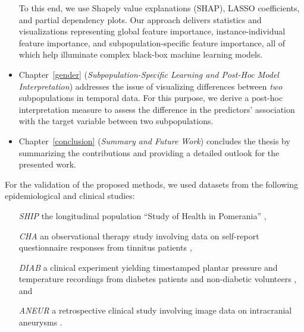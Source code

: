 \documentclass[
  oneside]{book}
\begin{document}
\begin{itemize}
  To this end, we use Shapely value explanations (SHAP), LASSO coefficients, and partial dependency plots.
  Our approach delivers statistics and visualizations representing global feature importance, instance-individual feature importance, and subpopulation-specific feature importance, all of which help illuminate complex black-box machine learning models.
\item
  Chapter~\ref{gender} (\emph{Subpopulation-Specific Learning and Post-Hoc Model Interpretation}) addresses the issue of visualizing differences between \emph{two} subpopulations in temporal data. For this purpose, we derive a post-hoc interpretation measure to assess the difference in the predictors' association with the target variable between two subpopulations.
\item
  Chapter~\ref{conclusion} (\emph{Summary and Future Work}) concludes the thesis by summarizing the contributions and providing a detailed outlook for the presented work.
\end{itemize}

For the validation of the proposed methods, we used datasets from the following epidemiological and clinical studies:

\begin{enumerate}
  \item[\emph{SHIP}] the longitudinal population ``Study of Health in Pomerania'' \autocite{Voelzke:SHIP11},
  \item[\emph{CHA}] an observational therapy study involving data on self-report questionnaire responses from tinnitus patients \autocite{Niemann:PONE2020}, 
  \item[\emph{DIAB}] a clinical experiment yielding timestamped plantar pressure and temperature recordings from diabetes patients and non-diabetic volunteers \autocite{Niemann:EBioMedicine2020}, and
  \item[\emph{ANEUR}] a retrospective clinical study involving image data on intracranial aneurysms \autocite{Niemann:CBMS2018}.
\end{enumerate}
\end{document}
